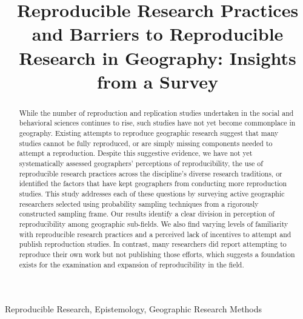 \documentclass[]{interact}
\theoremstyle{plain}%
\theoremstyle{definition}
\theoremstyle{remark}
\begin{document}

\title{Reproducible Research Practices and Barriers to Reproducible Research in Geography: Insights from a Survey}

\author{
}

\maketitle

\begin{abstract}
While the number of reproduction and replication studies undertaken in the social and behavioral sciences continues to rise, such studies have not yet become commonplace in geography. 
Existing attempts to reproduce geographic research suggest that many studies cannot be fully reproduced, or are simply missing components needed to attempt a reproduction. 
Despite this suggestive evidence, we have not yet systematically assessed geographers' perceptions of reproducibility, the use of reproducible research practices across the discipline's diverse research traditions, or identified the factors that have kept geographers from conducting more reproduction studies.
This study addresses each of these questions by surveying active geographic researchers selected using probability sampling techniques from a rigorously constructed sampling frame.
Our results identify a clear division in perception of reproducibility among geographic sub-fields. 
We also find varying levels of familiarity with reproducible research practices and a perceived lack of incentives to attempt and publish reproduction studies. 
In contrast, many researchers did report attempting to reproduce their own work but not publishing those efforts, which suggests a foundation exists for the examination and expansion of reproducibility in the field.

\end{abstract}

\begin{keywords}
Reproducible Research, Epistemology, Geographic Research Methods
\end{keywords}
\end{document}
